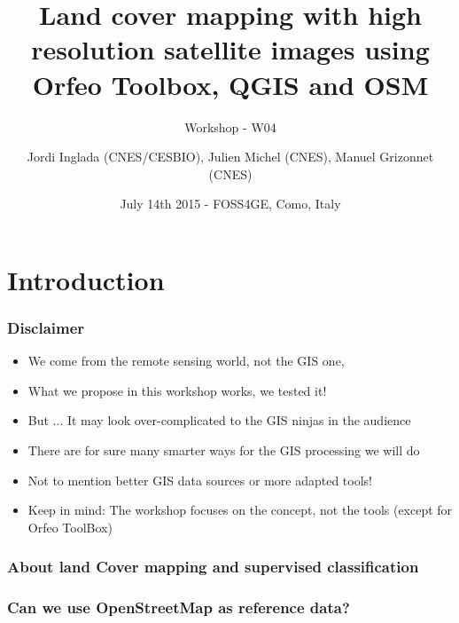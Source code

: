 \documentclass[8pt]{beamer}
\title{Land cover mapping with high resolution satellite images using Orfeo Toolbox, QGIS and OSM}
\subtitle{Workshop - W04}
\author{Jordi Inglada (CNES/CESBIO), Julien Michel (CNES), Manuel Grizonnet (CNES)}%
\date{July 14th 2015 - FOSS4GE, Como, Italy}
\begin{document}
\begin{frame}
\titlepage
\end{frame}

\section*{Introduction}

\begin{frame}
\frametitle{Disclaimer}

\begin{itemize}
\item We come from the remote sensing world, not the GIS one,
\item What we propose in this workshop works, we tested it! 
\item But ... It may look over-complicated to the GIS ninjas in the audience
\item There are for sure many smarter ways for the GIS processing we will do
\item Not to mention better GIS data sources or more adapted tools!
\item Keep in mind: The workshop focuses on the concept, not the tools (except for Orfeo ToolBox)
\end{itemize}

\end{frame}

\begin{frame}
\frametitle{About land Cover mapping and supervised classification}

\end{frame}

\begin{frame}
\frametitle{Can we use OpenStreetMap as reference data?}



\end{frame}
\end{document}

